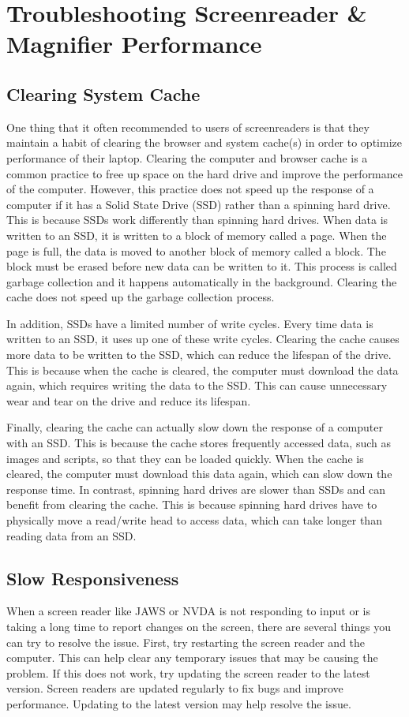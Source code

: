 \chapter{Troubleshooting Screenreader \& Magnifier Performance}\label{troubleshooting}
\section{Clearing System Cache}\label{cache}
One thing that it often recommended to users of screenreaders is that they maintain a habit of clearing the browser and system cache(s) in order to optimize performance of their laptop. Clearing the computer and browser cache is a common practice to free up space on the hard drive and improve the performance of the computer. However, this practice does not speed up the response of a computer if it has a Solid State Drive (SSD) rather than a spinning hard drive. This is because SSDs work differently than spinning hard drives. When data is written to an SSD, it is written to a block of memory called a page. When the page is full, the data is moved to another block of memory called a block. The block must be erased before new data can be written to it. This process is called garbage collection and it happens automatically in the background. Clearing the cache does not speed up the garbage collection process.

In addition, SSDs have a limited number of write cycles. Every time data is written to an SSD, it uses up one of these write cycles. Clearing the cache causes more data to be written to the SSD, which can reduce the lifespan of the drive. This is because when the cache is cleared, the computer must download the data again, which requires writing the data to the SSD. This can cause unnecessary wear and tear on the drive and reduce its lifespan.

Finally, clearing the cache can actually slow down the response of a computer with an SSD. This is because the cache stores frequently accessed data, such as images and scripts, so that they can be loaded quickly. When the cache is cleared, the computer must download this data again, which can slow down the response time. In contrast, spinning hard drives are slower than SSDs and can benefit from clearing the cache. This is because spinning hard drives have to physically move a read/write head to access data, which can take longer than reading data from an SSD.

\section{Slow Responsiveness}\label{response}
When a screen reader like JAWS or NVDA is not responding to input or is taking a long time to report changes on the screen, there are several things you can try to resolve the issue. First, try restarting the screen reader and the computer. This can help clear any temporary issues that may be causing the problem. If this does not work, try updating the screen reader to the latest version. Screen readers are updated regularly to fix bugs and improve performance. Updating to the latest version may help resolve the issue.

